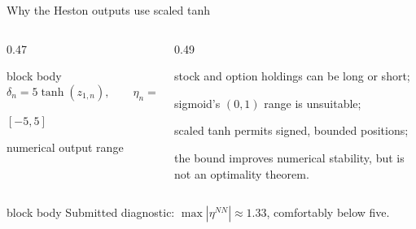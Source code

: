\begin{frame}[t]{Why the Heston outputs use scaled tanh}
  \begin{columns}[T,onlytextwidth]
    \begin{column}{0.47\textwidth}
      \begin{beamercolorbox}[rounded=true,sep=0.17cm]{block body}
        \centering
        \[ \delta_n=5\tanh(z_{1,n}),\qquad \eta_n=5\tanh(z_{2,n}). \]
        {\color{Teal}\fontsize{17}{19}\selectfont\bfseries \([-5,5]\)\par}
        {\small numerical output range}
      \end{beamercolorbox}
    \end{column}
    \begin{column}{0.49\textwidth}
      \begin{tightitemize}
        \item stock and option holdings can be long or short;
        \item sigmoid's \((0,1)\) range is unsuitable;
        \item scaled tanh permits signed, bounded positions;
        \item the bound improves numerical stability, but is not an optimality theorem.
      \end{tightitemize}
    \end{column}
  \end{columns}
  \vspace{0.18cm}
  \begin{beamercolorbox}[rounded=true,sep=0.13cm]{block body}
    \centering\small Submitted diagnostic: \(\max|\eta^{NN}|\approx1.33\), comfortably below five.
  \end{beamercolorbox}
\end{frame}

